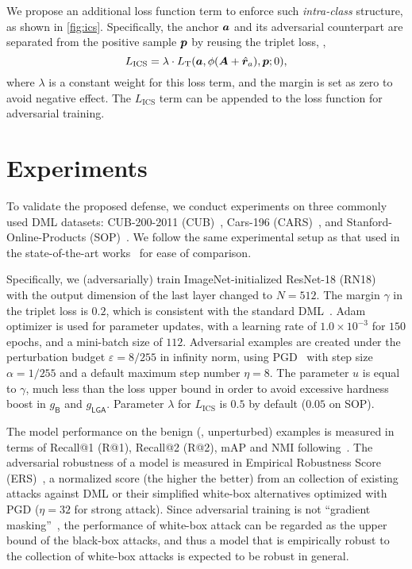 \documentclass[10pt,twocolumn,letterpaper]{article}
\begin{document}

We propose an additional loss function term to enforce such \emph{intra-class}
structure, as shown in \cref{fig:ics}.
%
Specifically, the anchor ${\bm{a}}$ and its adversarial counterpart
are separated from the positive sample ${\bm{p}}$ by reusing the triplet loss,
\ie,
%
\begin{equation}
	L_\text{ICS} = \lambda \cdot L_\text{T}(
	{\bm{a}}, \phi({\bm{A}} + \hat{{\bm{r}}}_a), {\bm{p}}; 0),
\end{equation}
%
where $\lambda$ is a constant weight for this loss term,
and the margin is set as zero to avoid negative effect.
%
The $L_\text{ICS}$ term can be appended to the loss function for
adversarial training.

\section{Experiments}
\label{sec:4}


To validate the proposed defense, we conduct experiments
on three commonly used DML datasets: CUB-200-2011 (CUB)~\cite{cub200}, Cars-196
(CARS)~\cite{cars196}, and Stanford-Online-Products (SOP)~\cite{sop}.
%
We follow the same experimental setup as that used in the state-of-the-art works~\cite{robrank,revisiting}
for ease of comparison.




Specifically, we (adversarially) train ImageNet-initialized ResNet-18
(RN18)~\cite{resnet} with the output dimension of the last layer changed to
$N{=}512$.
%
The margin $\gamma$ in the triplet loss is $0.2$, which is consistent with the standard
DML~\cite{revisiting}.
%
Adam~\cite{adam} optimizer is used for parameter updates, with a learning rate
of $1.0{\times}10^{-3}$ for $150$ epochs, and a mini-batch size of $112$.
%
Adversarial examples are created under the perturbation budget
$\varepsilon{=}8/255$ in infinity norm, using PGD~\cite{madry} with step size
$\alpha{=}1/255$ and a default maximum step number $\eta{=}8$.
%
The parameter $u$ is equal to $\gamma$, much less than the loss upper bound
in order to avoid excessive hardness boost in $g_\mathsf{B}$ and $g_\mathsf{LGA}$.
%
Parameter $\lambda$ for $L_\text{ICS}$ is $0.5$ by default ($0.05$ on SOP).

The model performance on the benign (\ie, unperturbed) examples is measured in terms of 
Recall@1 (R@1), Recall@2 (R@2), mAP and NMI
following~\cite{revisiting,robrank}.
%
The adversarial robustness of a model is measured in Empirical Robustness Score
(ERS)~\cite{robrank}, a normalized score (the higher the better) from
an collection of existing attacks against DML or their simplified white-box
alternatives optimized with PGD ($\eta=32$ for strong attack).
%
Since adversarial training is not ``gradient masking''~\cite{obfuscated}, the
performance of white-box attack can be regarded as the upper bound of the
black-box attacks, and thus a model that is empirically robust to the collection
of white-box attacks is expected to be robust in general.
\end{document}
